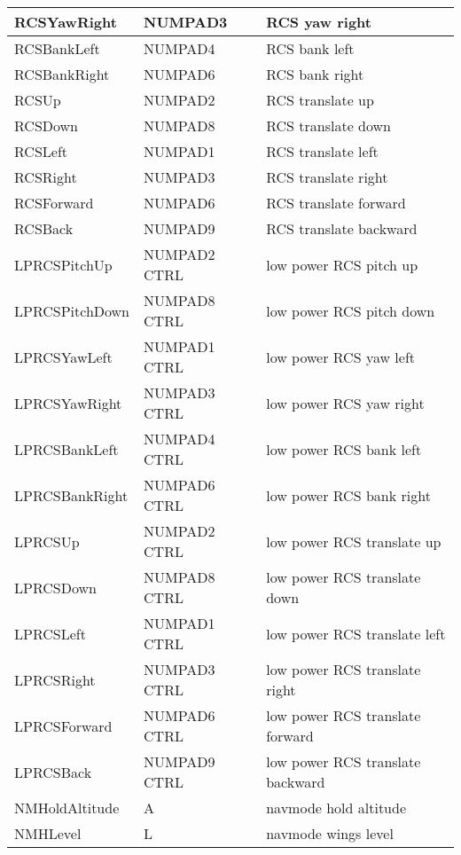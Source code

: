 \documentclass[Orbiter Developer Manual.tex]{subfiles}
\begin{document}
\begin{longtable}{ |p{}|p{}|p{}| }
	\hline\rule{0pt}{2ex}
	RCSYawRight & NUMPAD3 & RCS yaw right\\
	\hline\rule{0pt}{2ex}
	RCSBankLeft & NUMPAD4 & RCS bank left\\
	\hline\rule{0pt}{2ex}
	RCSBankRight & NUMPAD6 & RCS bank right\\
	\hline\rule{0pt}{2ex}
	RCSUp & NUMPAD2 & RCS translate up\\
	\hline\rule{0pt}{2ex}
	RCSDown & NUMPAD8 & RCS translate down\\
	\hline\rule{0pt}{2ex}
	RCSLeft & NUMPAD1 & RCS translate left\\
	\hline\rule{0pt}{2ex}
	RCSRight & NUMPAD3 & RCS translate right\\
	\hline\rule{0pt}{2ex}
	RCSForward & NUMPAD6 & RCS translate forward\\
	\hline\rule{0pt}{2ex}
	RCSBack & NUMPAD9 & RCS translate backward\\
	\hline\rule{0pt}{2ex}
	LPRCSPitchUp & NUMPAD2 CTRL & low power RCS pitch up\\
	\hline\rule{0pt}{2ex}
	LPRCSPitchDown & NUMPAD8 CTRL & low power RCS pitch down\\
	\hline\rule{0pt}{2ex}
	LPRCSYawLeft & NUMPAD1 CTRL & low power RCS yaw left\\
	\hline\rule{0pt}{2ex}
	LPRCSYawRight & NUMPAD3 CTRL & low power RCS yaw right\\
	\hline\rule{0pt}{2ex}
	LPRCSBankLeft & NUMPAD4 CTRL & low power RCS bank left\\
	\hline\rule{0pt}{2ex}
	LPRCSBankRight & NUMPAD6 CTRL & low power RCS bank right\\
	\hline\rule{0pt}{2ex}
	LPRCSUp & NUMPAD2 CTRL & low power RCS translate up\\
	\hline\rule{0pt}{2ex}
	LPRCSDown & NUMPAD8 CTRL & low power RCS translate down\\
	\hline\rule{0pt}{2ex}
	LPRCSLeft & NUMPAD1 CTRL & low power RCS translate left\\
	\hline\rule{0pt}{2ex}
	LPRCSRight & NUMPAD3 CTRL & low power RCS translate right\\
	\hline\rule{0pt}{2ex}
	LPRCSForward & NUMPAD6 CTRL & low power RCS translate forward\\
	\hline\rule{0pt}{2ex}
	LPRCSBack & NUMPAD9 CTRL & low power RCS translate backward\\
	\hline\rule{0pt}{2ex}
	NMHoldAltitude & A & navmode hold altitude\\
	\hline\rule{0pt}{2ex}
	NMHLevel & L & navmode wings level\\

\end{longtable}
\end{document}
